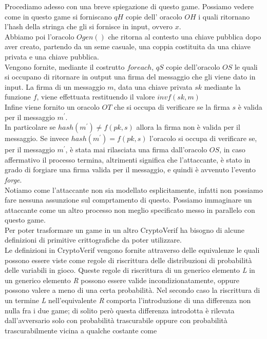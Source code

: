 \documentclass[a4paper,openright,twoside,12pt]{report}
\begin{document}
Procediamo adesso con una breve spiegazione di questo game.
Possiamo vedere come in questo game si forniscano $qH$ copie dell' oracolo $OH$ i quali ritornano l'hash della stringa che gli si fornisce in input, ovvero $x$.\\
Abbiamo poi l'oracolo $Ogen()$ che ritorna al contesto una chiave pubblica dopo aver creato, partendo da un seme casuale, una coppia costituita da una chiave privata e una chiave pubblica.\\
Vengono fornite, mediante il costrutto $foreach$, $qS$ copie dell'oracolo $OS$ le quali si occupano di ritornare in output una firma del messaggio che gli viene dato in input.
La firma di un messaggio $m$, data una chiave privata $sk$ mediante la funzione $f$, viene effettuata restituendo il valore $invf(sk, m)$\\ 
Infine viene fornito un oracolo $OT$ che si occupa di verificare se la firma $s$ \`e valida per il messaggio $m^{'}$. \\
In particolare se $hash(m^{'}) \neq f(pk, s)$ allora la firma non \`e valida per il messaggio. Se invece $hash(m^{'}) = f(pk, s)$
l'oracolo si occupa di verificare se, per il messaggio $m^{'}$, \`e stata mai rilasciata una firma dall'oracolo $OS$, in caso affermativo il processo termina, altrimenti significa che 
l'attaccante, \`e stato in grado di forgiare una firma valida per il messaggio, e quindi \`e avvenuto l'evento \emph{forge}.\\
Notiamo come l'attaccante non sia modellato esplicitamente, infatti non possiamo fare nessuna assunzione sul comprtamento di questo.
Possiamo immaginare un attaccante come un altro processo non meglio specificato messo in parallelo con questo game.\\ 
Per poter trasformare un game in un altro CryptoVerif ha bisogno di alcune definizioni di primitive crittografiche da poter utilizzare.
\\
Le definizioni in CryptoVerif vengono fornite attraverso delle equivalenze le quali possono essere viste come regole di riscrittura 
delle distribuzioni di probabilit\`a delle variabili in gioco.
Queste regole di riscrittura di un generico elemento \emph{L} in un generico elemento \emph{R} possono essere valide incondizionatamente, 
oppure possono valere a meno di una certa probabilit\`a.
Nel secondo caso la riscrittura di un termine \emph{L} nell'equivalente \emph{R} comporta l'introduzione di una differenza non nulla fra i due game; di solito per\`o
questa differenza introdotta \`e rilevata dall'avversario solo con probabilit\`a trascurabile oppure con probabilit\`a trascurabilmente vicina a qualche costante come 
\end{document}
